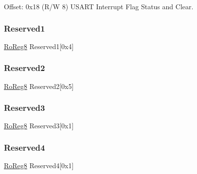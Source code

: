 Offset\+: 0x18 (R/W 8) U\+S\+A\+RT Interrupt Flag Status and Clear. 

\mbox{\label{struct_sercom_usart_a1106a1fe7c5fa01a183c54b4b992a7f0}} 
\subsubsection{\texorpdfstring{Reserved1}{Reserved1}}
{\footnotesize\ttfamily \mbox{\hyperlink{group___s_a_m_d21_e15_a__definitions_ga0d957f1433aaf5d70e4dc2b68288442d}{Ro\+Reg8}} Reserved1\mbox{[}0x4\mbox{]}}

\mbox{\label{struct_sercom_usart_adeca0ecf89b264312a507e2e88b9eb1a}} 
\subsubsection{\texorpdfstring{Reserved2}{Reserved2}}
{\footnotesize\ttfamily \mbox{\hyperlink{group___s_a_m_d21_e15_a__definitions_ga0d957f1433aaf5d70e4dc2b68288442d}{Ro\+Reg8}} Reserved2\mbox{[}0x5\mbox{]}}

\mbox{\label{struct_sercom_usart_ae12c3e940f27988a085afebe2f779a21}} 
\subsubsection{\texorpdfstring{Reserved3}{Reserved3}}
{\footnotesize\ttfamily \mbox{\hyperlink{group___s_a_m_d21_e15_a__definitions_ga0d957f1433aaf5d70e4dc2b68288442d}{Ro\+Reg8}} Reserved3\mbox{[}0x1\mbox{]}}

\mbox{\label{struct_sercom_usart_a5ca570382e961b7801aeafc161de2571}} 
\subsubsection{\texorpdfstring{Reserved4}{Reserved4}}
{\footnotesize\ttfamily \mbox{\hyperlink{group___s_a_m_d21_e15_a__definitions_ga0d957f1433aaf5d70e4dc2b68288442d}{Ro\+Reg8}} Reserved4\mbox{[}0x1\mbox{]}}

